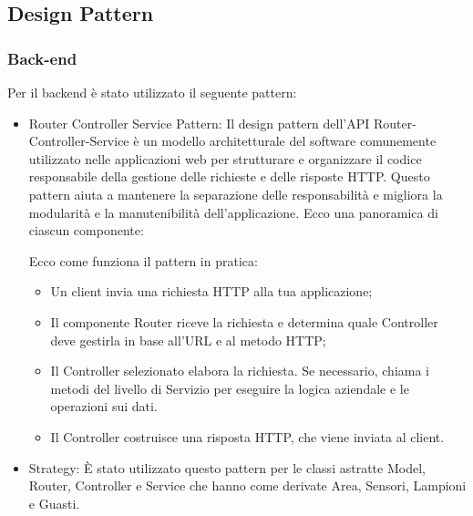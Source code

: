 \documentclass[12pt]{article}
\begin{document}
\subsection{Design Pattern}
\subsubsection{Back-end}
Per il backend è stato utilizzato il seguente pattern:
	\begin{itemize}
		\item Router Controller Service Pattern:
			Il design pattern dell'API Router-Controller-Service è un modello architetturale del software comunemente utilizzato nelle applicazioni web per strutturare e organizzare il codice responsabile della gestione delle richieste e delle risposte HTTP. Questo pattern aiuta a mantenere la separazione delle responsabilità e migliora la modularità e la manutenibilità dell'applicazione. Ecco una panoramica di ciascun componente:

			Ecco come funziona il pattern in pratica:
			\begin{itemize}
				\item Un client invia una richiesta HTTP alla tua applicazione;
				\item Il componente Router riceve la richiesta e determina quale Controller deve gestirla in base all'URL e al metodo HTTP;
				\item Il Controller selezionato elabora la richiesta. Se necessario, chiama i metodi del livello di Servizio per eseguire la logica aziendale e le operazioni sui dati.
				\item Il Controller costruisce una risposta HTTP, che viene inviata al client.
			\end{itemize}

		\item Strategy: È stato utilizzato questo pattern per le classi astratte Model, Router, Controller e Service che hanno come derivate Area, Sensori, Lampioni e Guasti.
	\end{itemize}
\end{document}
